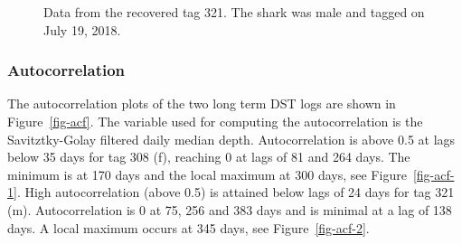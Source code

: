 \documentclass[
  authoryear,
  review,
  3p]{elsarticle}
\begin{document}
\begin{figure}

\begin{minipage}[t]{\linewidth}

{\centering 


}

\end{minipage}%
\newline
\begin{minipage}[t]{\linewidth}

{\centering 


}

\end{minipage}%

\caption{\label{fig-dst321}Data from the recovered tag 321. The shark
was male and tagged on July 19, 2018.}

\end{figure}

\hypertarget{sec-resacf}{%
\subsubsection{Autocorrelation}\label{sec-resacf}}

The autocorrelation plots of the two long term DST logs are shown in
Figure~\ref{fig-acf}. The variable used for computing the
autocorrelation is the Savitztky-Golay filtered daily median depth.
Autocorrelation is above 0.5 at lags below 35 days for tag 308 (f),
reaching 0 at lags of 81 and 264 days. The minimum is at 170 days and
the local maximum at 300 days, see Figure~\ref{fig-acf-1}. High
autocorrelation (above 0.5) is attained below lags of 24 days for tag
321 (m). Autocorrelation is 0 at 75, 256 and 383 days and is minimal at
a lag of 138 days. A local maximum occurs at 345 days, see
Figure~\ref{fig-acf-2}.
\end{document}
